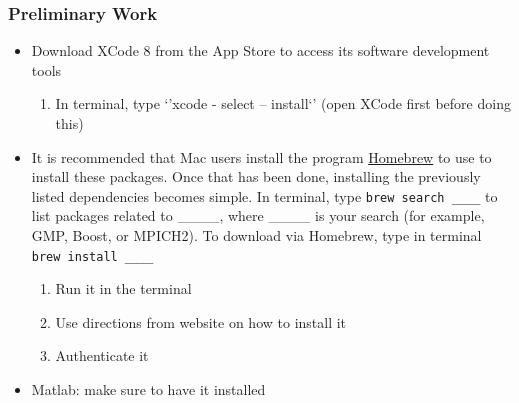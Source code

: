  \subsubsection{Preliminary Work}
  \begin{itemize}
    \item Download XCode 8 from the App Store to access its software development tools
    \begin{enumerate}
      \item In terminal, type `'xcode - select -- install`' (open XCode first before doing this)
    \end{enumerate}  
    \item It is recommended that Mac users install the program \href{http://brew.sh}{Homebrew} to use to install these packages. Once that has been done, installing the previously listed dependencies becomes simple. In terminal,  type \texttt{brew search \_\_\_\_} to list packages related to \_\_\_\_, where \_\_\_\_ is your search (for example, GMP, Boost, or MPICH2). To download via Homebrew, type in terminal \texttt{brew install \_\_\_\_}
     \begin{enumerate}
      \item Run it in the terminal
      \item Use directions from website on how to install it
      \item Authenticate it
     \end{enumerate}  
     \item Matlab: make sure to have it installed
  \end{itemize}

